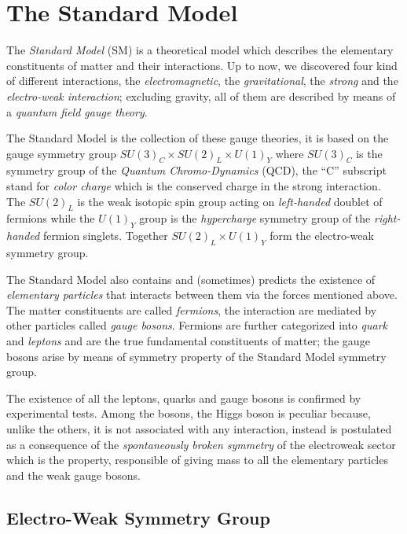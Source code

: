 \section{The Standard Model}
The \emph{Standard Model} (SM) is a theoretical model which describes the
elementary constituents of matter and their interactions. Up to now, we
discovered four kind of different interactions, the \emph{electromagnetic}, the
\emph{gravitational}, the \emph{strong} and the \emph{electro-weak interaction};
excluding gravity, all of them are described by means of a \emph{quantum field
  gauge theory}.

The Standard Model is the collection of these gauge theories, it is based on the
gauge symmetry group $SU(3)_C \times SU(2)_L \times U(1)_Y$ where $SU(3)_C$ is
the symmetry group of the \emph{Quantum Chromo-Dynamics} (QCD), the ``C''
subscript stand for \emph{color charge} which is the conserved charge in the
strong interaction. The $SU(2)_L$ is the weak isotopic spin group acting on
\emph{left-handed} doublet of fermions while the $U(1)_Y$ group is the
\emph{hypercharge} symmetry group of the \emph{right-handed} fermion
singlets. Together $SU(2)_L \times U(1)_Y$ form the electro-weak symmetry group.

The Standard Model also contains and (sometimes) predicts the existence of
\emph{elementary particles} that interacts between them via the forces mentioned
above. The matter constituents are called \emph{fermions}, the interaction are
mediated by other particles called \emph{gauge bosons}. Fermions are further
categorized into \emph{quark} and \emph{leptons} and are the true fundamental
constituents of matter; the gauge bosons arise by means of symmetry property of
the Standard Model symmetry group.

The existence of all the leptons, quarks and gauge bosons is confirmed by
experimental tests. Among the bosons, the Higgs boson is peculiar because,
unlike the others, it is not associated with any interaction, instead is
postulated as a consequence of the \emph{spontaneously broken symmetry} of the
electroweak sector which is the property, responsible of giving mass to all the
elementary particles and the weak gauge bosons.

\subsection{Electro-Weak Symmetry Group}
\label{sec:electro-weak-symm}


